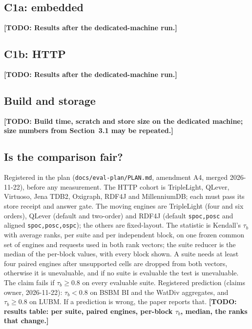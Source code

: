 \documentclass[sigconf, nonacm]{acmart}
\newcommand{\todo}[1]{\textbf{[TODO: #1]}}
\begin{document}
\subsection{C1a: embedded}\todo{Results after the dedicated-machine run.}
\subsection{C1b: HTTP}\todo{Results after the dedicated-machine run.}
\subsection{Build and storage}\todo{Build time, scratch and store size on the dedicated machine; size numbers from Section~3.1 may be repeated.}
\subsection{Is the comparison fair?}
Registered in the plan (\texttt{docs/eval-plan/PLAN.md}, amendment A4, merged 2026-11-22), before any measurement. The HTTP cohort is TripleLight, QLever, Virtuoso, Jena TDB2, Oxigraph, RDF4J and MillenniumDB; each must pass its store receipt and answer gate.
The moving engines are TripleLight (four and six orders), QLever (default and two-order) and RDF4J (default \texttt{spoc,posc} and aligned \texttt{spoc,posc,ospc}); the others are fixed-layout.
The statistic is Kendall's $\tau_b$ with average ranks, per suite and per independent block, on one frozen common set of engines and requests used in both rank vectors; the suite reducer is the median of the per-block values, with every block shown.
A suite needs at least four paired engines after unsupported cells are dropped from both vectors, otherwise it is unevaluable, and if no suite is evaluable the test is unevaluable. The claim fails if $\tau_b \ge 0.8$ on every evaluable suite.
Registered prediction (claims owner, 2026-11-22): $\tau_b < 0.8$ on BSBM BI and the WatDiv aggregates, and $\tau_b \ge 0.8$ on LUBM. If a prediction is wrong, the paper reports that.
\todo{results table: per suite, paired engines, per-block $\tau_b$, median, the ranks that change.}
\end{document}
